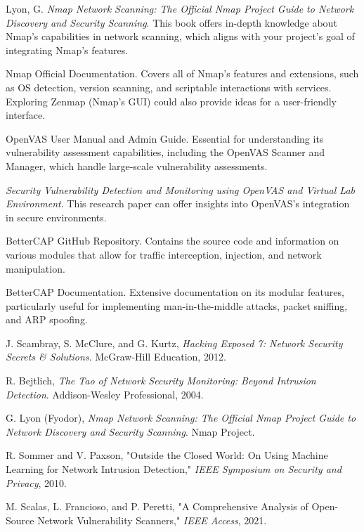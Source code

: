 \documentclass[conference]{IEEEtran}
\begin{document}
\begin{thebibliography}{9}
    Lyon, G. \textit{Nmap Network Scanning: The Official Nmap Project Guide to Network Discovery and Security Scanning}. 
    This book offers in-depth knowledge about Nmap's capabilities in network scanning, which aligns with your project's goal of integrating Nmap's features.

    Nmap Official Documentation. 
    Covers all of Nmap’s features and extensions, such as OS detection, version scanning, and scriptable interactions with services. Exploring Zenmap (Nmap’s GUI) could also provide ideas for a user-friendly interface.

    OpenVAS User Manual and Admin Guide. 
    Essential for understanding its vulnerability assessment capabilities, including the OpenVAS Scanner and Manager, which handle large-scale vulnerability assessments.

    \textit{Security Vulnerability Detection and Monitoring using OpenVAS and Virtual Lab Environment}. 
    This research paper can offer insights into OpenVAS's integration in secure environments.

    BetterCAP GitHub Repository. 
    Contains the source code and information on various modules that allow for traffic interception, injection, and network manipulation.

    BetterCAP Documentation. 
    Extensive documentation on its modular features, particularly useful for implementing man-in-the-middle attacks, packet sniffing, and ARP spoofing.

J. Scambray, S. McClure, and G. Kurtz, \textit{Hacking Exposed 7: Network Security Secrets \& Solutions}. McGraw-Hill Education, 2012.

R. Bejtlich, \textit{The Tao of Network Security Monitoring: Beyond Intrusion Detection}. Addison-Wesley Professional, 2004.

G. Lyon (Fyodor), \textit{Nmap Network Scanning: The Official Nmap Project Guide to Network Discovery and Security Scanning}. Nmap Project.

R. Sommer and V. Paxson, "Outside the Closed World: On Using Machine Learning for Network Intrusion Detection," \textit{IEEE Symposium on Security and Privacy}, 2010.

M. Scalas, L. Francioso, and P. Peretti, "A Comprehensive Analysis of Open-Source Network Vulnerability Scanners," \textit{IEEE Access}, 2021.


\end{thebibliography}
\end{document}
